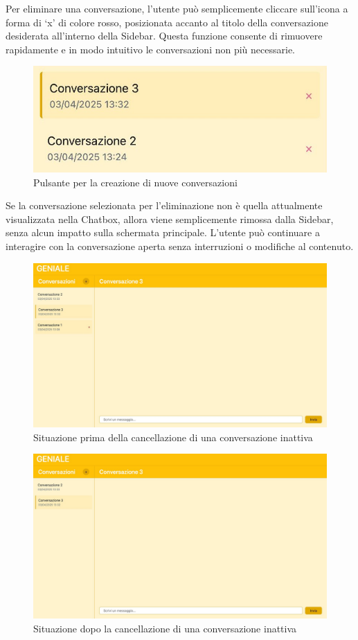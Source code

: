 Per eliminare una conversazione, l’utente può semplicemente cliccare sull’icona a forma di ‘x’ di colore rosso, posizionata accanto al titolo della conversazione desiderata all’interno della Sidebar. Questa funzione consente di rimuovere rapidamente e in modo intuitivo le conversazioni non più necessarie.
\begin{figure}[H]
\centering
\includegraphics[width=1\textwidth]{contents/img/rm_conv.jpg}
\caption{Pulsante per la creazione di nuove conversazioni}
\end{figure}
Se la conversazione selezionata per l’eliminazione non è quella attualmente visualizzata nella Chatbox, allora viene semplicemente rimossa dalla Sidebar, senza alcun impatto sulla schermata principale. L’utente può continuare a interagire con la conversazione aperta senza interruzioni o modifiche al contenuto.
\begin{figure}[H]
\centering
\includegraphics[width=1\textwidth]{contents/img/rm_conv_inactive_before.jpg}
\caption{Situazione prima della cancellazione di una conversazione inattiva}
\end{figure}
\begin{figure}[H]
\centering
\includegraphics[width=1\textwidth]{contents/img/rm_conv_inactive_after.jpg}
\caption{Situazione dopo la cancellazione di una conversazione inattiva}
\end{figure}
